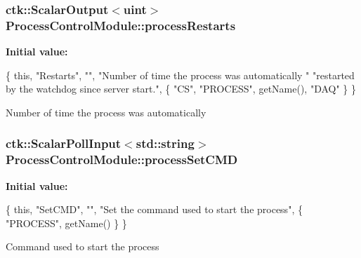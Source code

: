 \subsubsection[{\texorpdfstring{process\+Restarts}{processRestarts}}]{\setlength{\rightskip}{0pt plus 5cm}ctk\+::\+Scalar\+Output$<$uint$>$ Process\+Control\+Module\+::process\+Restarts}\hypertarget{structProcessControlModule_a52d785e727ec341c125e18c433f9fbe0}{}\label{structProcessControlModule_a52d785e727ec341c125e18c433f9fbe0}
{\bfseries Initial value\+:}
\begin{DoxyCode}
\{ \textcolor{keyword}{this}, \textcolor{stringliteral}{"Restarts"}, \textcolor{stringliteral}{""}, \textcolor{stringliteral}{"Number of time the process was automatically "}
          \textcolor{stringliteral}{"restarted by the watchdog since server start."},
    \{ \textcolor{stringliteral}{"CS"}, \textcolor{stringliteral}{"PROCESS"}, getName(), \textcolor{stringliteral}{"DAQ"} \} \}
\end{DoxyCode}
Number of time the process was automatically 
\subsubsection[{\texorpdfstring{process\+Set\+C\+MD}{processSetCMD}}]{\setlength{\rightskip}{0pt plus 5cm}ctk\+::\+Scalar\+Poll\+Input$<$std\+::string$>$ Process\+Control\+Module\+::process\+Set\+C\+MD}\hypertarget{structProcessControlModule_a0f8c1a2b80ca32287fa60af12da681f7}{}\label{structProcessControlModule_a0f8c1a2b80ca32287fa60af12da681f7}
{\bfseries Initial value\+:}
\begin{DoxyCode}
\{ \textcolor{keyword}{this}, \textcolor{stringliteral}{"SetCMD"}, \textcolor{stringliteral}{""}, \textcolor{stringliteral}{"Set the command used to start the process"},
    \{ \textcolor{stringliteral}{"PROCESS"}, getName() \} \}
\end{DoxyCode}
Command used to start the process 
